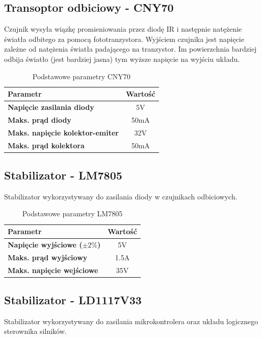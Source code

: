 \documentclass[10pt, a4paper]{article}
\begin{document}
\subsection{Transoptor odbiciowy - CNY70\cite{Vishay}}
\noindent Czujnik wysyła wiązkę promieniowania przez diodę IR i następnie natężenie światła odbitego za pomocą fototranzystora. Wyjściem czujnika jest napięcie zależne od natężenia światła padającego na tranzystor. Im powierzchnia bardziej odbija światło (jest bardziej jasna) tym wyższe napięcie na wyjściu układu. 

\begin{table}[H]
	\centering
	\begin{tabular}{|l|c|} \hline
		\textbf{Parametr} & Wartość \\
		\hline
		\hline  \textbf{Napięcie zasilania diody}& 5V\\\hline
		\textbf{Maks. prąd diody} & 50mA\\
		\hline
		\textbf{Maks. napięcie kolektor-emiter} & 32V\\
		\hline
		\textbf{Maks. prąd kolektora} & 50mA\\
		\hline
	\end{tabular}
	\caption{Podstawowe parametry CNY70}
	\label{tab:CNY70}
\end{table}

\subsection{Stabilizator - LM7805\cite{LM7805}}
\noindent Stabilizator wykorzystywany do zasilania diody w czujnikach odbiciowych. 

\begin{table}[H]
	\centering
	\begin{tabular}{|l|c|} \hline
		\textbf{Parametr} & Wartość \\
		\hline
		\hline  \textbf{Napięcie wyjściowe ($\pm 2\%$)}& 5V\\\hline
		\textbf{Maks. prąd wyjściowy} & 1.5A\\
		\hline
		\textbf{Maks. napięcie wejściowe} & 35V\\
		\hline
	\end{tabular}
	\caption{Podstawowe parametry LM7805}
	\label{tab:LM7805}
\end{table}

\subsection{Stabilizator - LD1117V33\cite{LD117}}
\noindent Stabilizator wykorzystywany do zasilania mikrokontrolera oraz układu logicznego sterownika silników.
\end{document}
